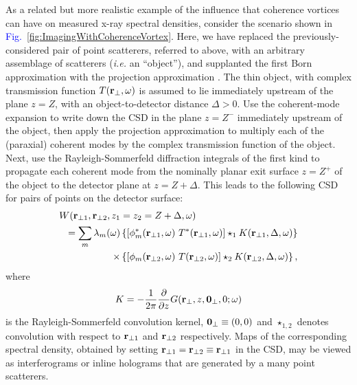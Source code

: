 \documentclass[%
 reprint,
 amsmath,amssymb,
 aps,
]{revtex4-1}
\begin{document}
As a related but more realistic example of the  influence that coherence vortices can have on measured x-ray spectral densities, consider the scenario shown in \textcolor{blue}{Fig.~\ref{fig:ImagingWithCoherenceVortex}}.  Here, we have replaced the previously-considered pair of point scatterers, referred to above, with an arbitrary assemblage of scatterers ({\em i.e.} an ``object''), and supplanted the first Born approximation with the projection approximation \cite{paganin_book}.  The thin object, with complex transmission function $T({\bf r}_{\perp},\omega)$ is assumed to lie immediately upstream of the plane $z=Z$, with an object-to-detector distance $\Delta > 0$.  Use the coherent-mode expansion to write down the CSD in the plane $z=Z^-$ immediately upstream of the object, then apply the projection approximation to multiply each of the (paraxial) coherent modes by the complex transmission function of the object.  Next, use the Rayleigh-Sommerfeld diffraction integrals of the first kind \cite{Rayleigh, Sommerfeld, mandel_wolf} to propagate each coherent mode from the nominally planar exit surface $z=Z^+$ of the object to the detector plane at $z=Z+\Delta$.  This leads to the following CSD for pairs of points on the detector surface:     
\begin{equation}
\begin{aligned}
\label{eq:CSD_with_object_and_detector}
W ({\bf r}_{\perp 1}, {\bf r}_{\perp 2},z_1 &=z_2=Z+\Delta,\omega) \\ =\sum_m \lambda_m({\omega}) & \left\{ [\phi_m^*({\bf r}_{\perp 1},\omega)~T^*({\bf r}_{\perp 1},\omega)]\star_1 K({\bf r}_{\perp 1},\Delta,\omega)\right\} \\ \times & \left\{ [\phi_m({\bf r}_{\perp 2},\omega)~T({\bf r}_{\perp 2},\omega)]\star_2 K({\bf r}_{\perp 2},\Delta,\omega)\right\},
\end{aligned}
\end{equation}
where 
\begin{equation}
K=-\frac{1}{2\pi} \frac{\partial}{\partial z} G({\bf r}_{\perp},z,{\bf 0}_{\perp},0;\omega) 
\end{equation}
is the Rayleigh-Sommerfeld convolution kernel, ${\bf 0}_{\perp}\equiv (0,0)$ and $\star_{1,2}$ denotes convolution with respect to ${\bf r}_{\perp 1}$ and ${\bf r}_{\perp 2}$ respectively.  Maps of the corresponding spectral density, obtained by setting ${\bf r}_{\perp 1}={\bf r}_{\perp 2}\equiv{\bf r}_{\perp 1}$ in the CSD, may be viewed as interferograms or inline holograms that are generated by a many point scatterers.   
\end{document}
